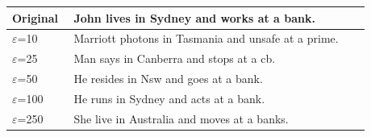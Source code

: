 \begin{tabular}{@{}p{0.16\linewidth}p{0.77\linewidth}@{}}
\toprule
Original & John lives in Sydney and works at a bank. \\
\midrule
$\varepsilon$=10 & Marriott photons in Tasmania and unsafe at a prime. \\
$\varepsilon$=25 & Man says in Canberra and stops at a cb. \\
$\varepsilon$=50 & He resides in Nsw and goes at a bank. \\
$\varepsilon$=100 & He runs in Sydney and acts at a bank. \\
$\varepsilon$=250 & She live in Australia and moves at a banks. \\
\bottomrule
\end{tabular}
